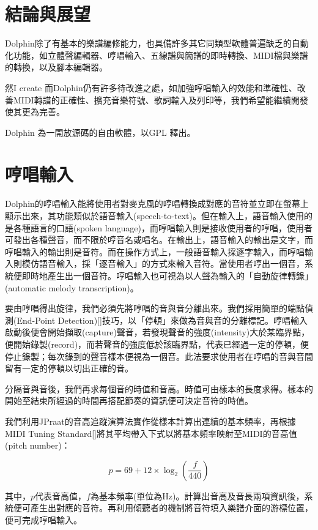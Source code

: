 \documentclass[12pt,a4paper,oneside]{report}
\begin{document}
\chapter{結論與展望}

Dolphin除了有基本的樂譜編修能力，也具備許多其它同類型軟體普遍缺乏的自動化功能，如立體聲編輯器、哼唱輸入、五線譜與簡譜的即時轉換、MIDI檔與樂譜的轉換，以及腳本編輯器。

然I create 而Dolphin仍有許多待改進之處，如加強哼唱輸入的效能和準確性、改善MIDI轉譜的正確性、擴充音樂符號、歌詞輸入及列印等，我們希望能繼續開發使其更為完善。

Dolphin 為一開放源碼的自由軟體，以GPL 釋出。


\appendix

\chapter{哼唱輸入}

Dolphin的哼唱輸入能將使用者對麥克風的哼唱轉換成對應的音符並立即在螢幕上顯示出來，其功能類似於語音輸入(speech-to-text)。但在輸入上，語音輸入使用的是各種語言的口語(spoken language)，而哼唱輸入則是接收使用者的哼唱，使用者可發出各種聲音，而不限於哼音名或唱名。在輸出上，語音輸入的輸出是文字，而哼唱輸入的輸出則是音符。而在操作方式上，一般語音輸入採逐字輸入，而哼唱輸入則模仿語音輸入，採「逐音輸入」的方式來輸入音符。當使用者哼出一個音，系統便即時地產生出一個音符。哼唱輸入也可視為以人聲為輸入的「自動旋律轉錄」(automatic melody transcription)。

要由哼唱得出旋律，我們必須先將哼唱的音與音分離出來。我們採用簡單的端點偵測(End-Point Detection)[]技巧，以「停頓」來做為音與音的分離標記。哼唱輸入啟動後便會開始擷取(capture)聲音，若發現聲音的強度(intensity)大於某臨界點，便開始錄製(record)，而若聲音的強度低於該臨界點，代表已經過一定的停頓，便停止錄製；每次錄到的聲音樣本便視為一個音。此法要求使用者在哼唱的音與音間留有一定的停頓以切出正確的音。

分隔音與音後，我們再求每個音的時值和音高。時值可由樣本的長度求得。樣本的開始至結束所經過的時間再搭配節奏的資訊便可決定音符的時值。

我們利用JPraat的音高追蹤演算法實作從樣本計算出連續的基本頻率，再根據MIDI Tuning Standard[]將其平均帶入下式以將基本頻率映射至MIDI的音高值(pitch number)：

\[
p=69+12\times\log_2{\left(\frac{f}{440}\right)}
\]

其中，\(p\)代表音高值，\(f\)為基本頻率(單位為Hz)。計算出音高及音長兩項資訊後，系統便可產生出對應的音符。再利用傾聽者的機制將音符填入樂譜介面的游標位置，便可完成哼唱輸入。
\end{document}

